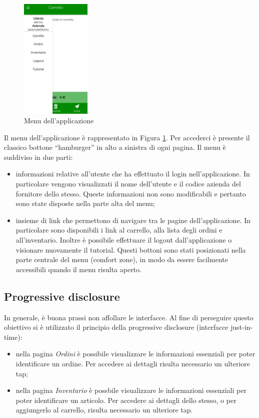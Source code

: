 \documentclass[12pt, a4paper, titlepage]{report}
\begin{document}
	\begin{figure}[H] 
		\centering
		\includegraphics[width=0.3\textwidth]{img/menu}
		\caption{Menu dell'applicazione}
		\label{fig:menu}
	\end{figure}
	Il menu dell'applicazione è rappresentato in Figura \ref{fig:menu}. Per accederci è presente il classico bottone ``hamburger'' in alto a sinistra di ogni pagina. Il menu è suddiviso in due parti: 
	\begin{itemize}
		\item informazioni relative all'utente che ha effettuato il login nell'applicazione. In particolare vengono visualizzati il nome dell'utente e il codice azienda del fornitore dello stesso. Queste informazioni non sono modificabili e pertanto sono state disposte nella parte alta del menu;
		\item insieme di link che permettono di navigare tra le pagine dell'applicazione. In particolare sono disponibili i link al carrello, alla lista degli ordini e all'inventario. Inoltre è possibile effettuare il logout dall'applicazione o visionare nuovamente il tutorial. Questi bottoni sono stati posizionati nella parte centrale del menu (comfort zone), in modo da essere facilmente accessibili quando il menu risulta aperto.
	\end{itemize}

	\subsection{Progressive disclosure}
	
	In generale, è buona prassi non affollare le interfacce. Al fine di perseguire questo obiettivo si è utilizzato il principio della progressive disclosure (interfacce just-in-time):
	\begin{itemize}
		\item nella pagina \textit{Ordini} è possibile visualizzare le informazioni essenziali per poter identificare un ordine. Per accedere ai dettagli risulta necessario un ulteriore tap;
		\item nella pagina \textit{Inventario} è possbile visualizzare le informazioni essenziali per poter identificare un articolo. Per accedere ai dettagli dello stesso, o per aggiungerlo al carrello, risulta necessario un ulteriore tap.
	\end{itemize}
	
\end{document}
